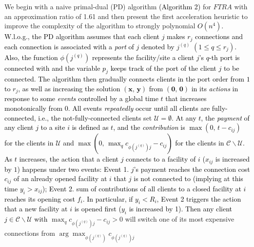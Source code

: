 \documentclass[10pt]{llncs}
\begin{document}
We begin with a naive primal-dual (PD) algorithm \textcolor{black}{(Algorithm
2)} for $FTRA$ with an approximation ratio of 1.61 and then present
the first acceleration heuristic to improve the complexity of the
algorithm to strongly polynomial \textcolor{black}{$O\left(n^{4}\right)$.
W.l.o.g., the PD algorithm assumes that each client $j$ makes $r_{j}$
connections and each connection is associated with a }\textit{\textcolor{black}{port}}\textcolor{black}{{}
of $j$ denoted by }$j^{\left(q\right)}$\textcolor{black}{{} $\left(1\leq q\leq r_{j}\right)$.
Also, the function $\phi\left(j^{\left(q\right)}\right)$ represents
the facility/site a client $j$'s $q$-th port is connected with and
the variable $p_{j}$ keeps track of the port of the client $j$ to
be connected. The algorithm then gradually connects clients in the
port order from $1$ to $r_{j}$, as well as increasing the solution
$\left(\boldsymbol{x},\,\boldsymbol{y}\right)$ from $\left(\boldsymbol{0},\,\boldsymbol{0}\right)$
in its }\textit{\textcolor{black}{actions}}\textcolor{black}{{} in response
to some }\textit{\textcolor{black}{events }}\textcolor{black}{controlled
by a global time $t$ that increases monotonically from $0$. All
events }\textit{\textcolor{black}{repeatedly}}\textcolor{black}{{} occur
until all clients are fully-connected, i.e., the not-fully-connected
clients s}et \textcolor{black}{$\mathcal{U}=\emptyset$. At any $t$,
the }\textit{\textcolor{black}{payment}}\textcolor{black}{{} of any
client $j$ to a site $i$ is defined as $t$, and the }\textit{\textcolor{black}{contribution}}\textcolor{black}{{}
is $\max\left(0,\, t-c_{ij}\right)$ for the clients in $\mathcal{U}$
and $\max\left(0,\,\max_{q}c_{\phi\left(j^{\left(q\right)}\right)j}-c_{ij}\right)$
for the clients in $\mathcal{C}\backslash\mathcal{U}$. As $t$ increases,
the action that a client $j$ connects to a facility of $i$ ($x_{ij}$
is increased by $1$) happens under two events: Event 1. $j$'s payment
reaches the connection cost $c_{ij}$ of an already opened facility
at $i$ that $j$ is not connected to (implying at this time $y_{i}>x_{ij}$);
Event 2. sum of contributions of all clients to a closed facility
at $i$ reaches its opening cost $f_{i}$. In particular, if $y_{i}<R_{i}$,
Event 2 triggers the action that a new facility at $i$ is opened
first ($y_{i}$ is increased by 1). Then any client $j\in\mathcal{C}\backslash\mathcal{U}$
with }$\max_{q}c_{\phi\left(j^{\left(q\right)}\right)j}-c_{ij}>0$
will switch one of its most expensive connections from $\arg\max_{\phi\left(j^{\left(q\right)}\right)}c_{\phi\left(j^{\left(q\right)}\right)j}$
\end{document}
